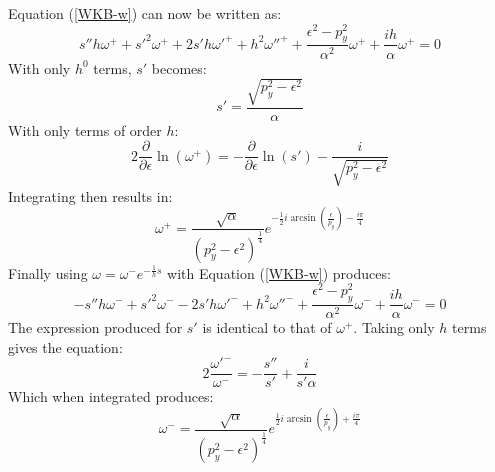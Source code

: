 		Equation (\ref{WKB-w}) can now be written as:
		\begin{equation}
			s''h\omega^{+}+s'^{2}\omega^{+}+2s'h\omega'^{+}+h^{2}\omega''^{+}+\frac{\epsilon^{2}-p_{y}^{2}}{\alpha^{2}}\omega^{+}+\frac{ih}{\alpha}\omega^{+}=0
		\end{equation}
		With only $h^{0}$ terms, $s'$ becomes:
		\begin{equation}
			s'=\frac{\sqrt{p_{y}^{2}-\epsilon^{2}}}{\alpha}
		\end{equation}
		With only terms of order $h$:
		\begin{equation}
			2\frac{\partial}{\partial\epsilon}\ln(\omega^{+})=-\frac{\partial}{\partial\epsilon}\ln(s')-\frac{i}{\sqrt{p_{y}^{2}-\epsilon^{2}}}
		\end{equation}
		Integrating then results in:
		\begin{equation}
			\omega^{+}=\frac{\sqrt{\alpha}}{\left(p_{y}^{2}-\epsilon^{2}\right)^{\frac{1}{4}}}e^{-\frac{1}{2}i\arcsin\left(\frac{\epsilon}{p_{y}}\right)-\frac{i\pi}{4}}
		\end{equation}
		Finally using $\omega=\omega^{-}e^{-\frac{1}{h}s}$ with Equation (\ref{WKB-w}) produces:
		\begin{equation}
			-s''h\omega^{-}+s'^{2}\omega^{-}-2s'h\omega'^{-}+h^{2}\omega''^{-}+\frac{\epsilon^{2}-p_{y}^{2}}{\alpha^{2}}\omega^{-}+\frac{ih}{\alpha}\omega^{-}=0
		\end{equation}
		The expression produced for $s'$ is identical to that of $\omega^{+}$. Taking only $h$ terms gives the equation:
		\begin{equation}
			2\frac{\omega'^{-}}{\omega^{-}}=-\frac{s''}{s'}+\frac{i}{s'\alpha}
		\end{equation}
		Which when integrated produces:
		\begin{equation}
			\omega^{-}=\frac{\sqrt{\alpha}}{\left(p_{y}^{2}-\epsilon^{2}\right)^{\frac{1}{4}}}e^{\frac{1}{2}i\arcsin\left(\frac{\epsilon}{p_{y}}\right)+\frac{i\pi}{4}}
		\end{equation}
